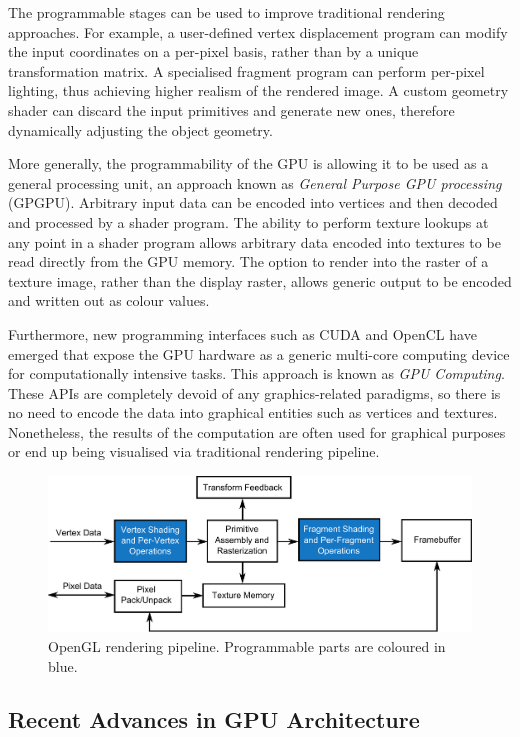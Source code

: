 \documentclass[11pt,a4paper,twoside]{article}
\begin{document}
The programmable stages can be used to improve traditional rendering approaches. For example, a user-defined vertex displacement program can modify the input coordinates on a per-pixel basis, rather than by a unique transformation matrix. A specialised fragment program can perform per-pixel lighting, thus achieving higher realism of the rendered image. A custom geometry shader can discard the input primitives and generate new ones, therefore dynamically adjusting the object geometry.

More generally, the programmability of the GPU is allowing it to be used as a general processing unit, an approach known as \emph{General Purpose GPU processing} (GPGPU). Arbitrary input data can be encoded into vertices and then decoded and processed by a shader program. The ability to perform texture lookups at any point in a shader program allows arbitrary data encoded into textures to be read directly from the GPU memory. The option to render into the raster of a texture image, rather than the display raster, allows generic output to be encoded and written out as colour values.

Furthermore, new programming interfaces such as CUDA \cite{Cuda} and OpenCL \cite{OpenCL} have emerged that expose the GPU hardware as a generic multi-core computing device for computationally intensive tasks. This approach is known as \emph{GPU Computing}. These APIs  are completely devoid of any graphics-related paradigms, so there is no need to encode the data into graphical entities such as vertices and textures. Nonetheless, the results of the computation are often used for graphical purposes or end up being visualised via traditional rendering pipeline.

\begin {figure}
	\centering
	\includegraphics [width=0.8\columnwidth]{figures/gl_pipeline}
	\caption {OpenGL rendering pipeline. Programmable parts are coloured in blue.}
	\label {fig:gl_pipeline}
\end {figure}

\subsection{Recent Advances in GPU Architecture}
\label{sec:recent}
\end{document}
